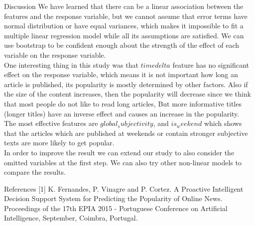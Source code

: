 \documentclass[a4paper,11pt]{article}
\begin{document}
\begin{section}{Discussion}
We have learned that there can be a linear association between the features and the response variable, but we cannot assume that error terms have normal distribution or have equal variances, which makes it impossible to fit a multiple linear regression model while all its assumptions are satisfied. We can use bootstrap to be confident enough about the strength of the effect of each variable on the response variable.\\
One interesting thing in this study was that $timedelta$ feature has no significant effect on the response variable, which means it is not important how long an article is published, its popularity is mostly determined by other factors. Also if the size of the content increases, then the popularity will decrease since we think that most people do not like to read long articles, But more informative titles (longer titles) have an inverse effect and causes an increase in the popularity.\\
The most effective features are $global_subjectivity$, and $is_weekend$ which shows that the articles which are published at weekends or contain stronger subjective texts are more likely to get popular.\\
In order to improve the result we can extend our study to also consider the omitted variables at the first step. We can also try other non-linear models to compare the results.

\end{section}

\begin{section}{References}
[1] K. Fernandes, P. Vinagre and P. Cortez. A Proactive Intelligent Decision
    Support System for Predicting the Popularity of Online News. Proceedings
    of the 17th EPIA 2015 - Portuguese Conference on Artificial Intelligence,
    September, Coimbra, Portugal.
\end{section}
\end{document}
